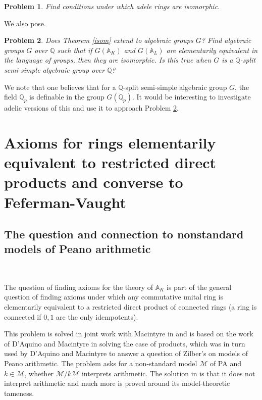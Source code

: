 \documentclass[12pt]{amsart}
\def\A{\mathbb{A}}
\def\Q{\mathbb{Q}}
\def\cM{\mathcal M}
\numberwithin{equation}{section}
\newtheorem{prob}{Problem}[section]
\begin{document}
\begin{prob} Find conditions under which adele rings are isomorphic.\end{prob}

We also pose.

\begin{prob}\label{prob-isom} Does Theorem \ref{isom} extend to algebraic groups $G$? Find algebraic groups $G$ over $\Q$ such that if $G(\A_K)$ and $G(\A_L)$ are elementarily equivalent in the language of groups, then 
they are isomorphic. Is this true when $G$ is a $\Q$-split semi-simple algebraic group over $\Q$?\end{prob}
We note that one believes that for a $\Q$-split semi-simple algebraic group $G$, the field $\Q_p$ is definable in the group $G(\Q_p)$. It would be interesting to investigate adelic versions of this and use it to approach Problem \ref{prob-isom}.

\section{\bf Axioms for rings elementarily equivalent to restricted direct products and converse to Feferman-Vaught}\label{sec-axioms}

\medskip

\subsection{\bf The question and connection to nonstandard models of Peano arithmetic}

\

\medskip

The question of finding axioms for the theory of $\A_K$ is part of the general question of finding 
axioms under which any commutative unital ring is elementarily equivalent to a restricted direct product of
connected rings (a ring is connected if $0,1$ are the only idempotents). 

This problem is solved in joint work with 
Macintyre in \cite{DM-axioms} and is based on the work of D'Aquino and Macintyre in \cite{elem-prod} solving the case of products, which was in turn used by D'Aquino and Macintyre to answer a question of Zilber's on models of Peano arithmetic. The problem asks for a non-standard model $\cM$ of PA and $k\in \cM$, whether $\cM/k\cM$ interprets arithmetic. The solution in \cite{PDAJM} is that it does not interpret arithmetic and much more is proved around its model-theoretic tameness. 
\end{document}
